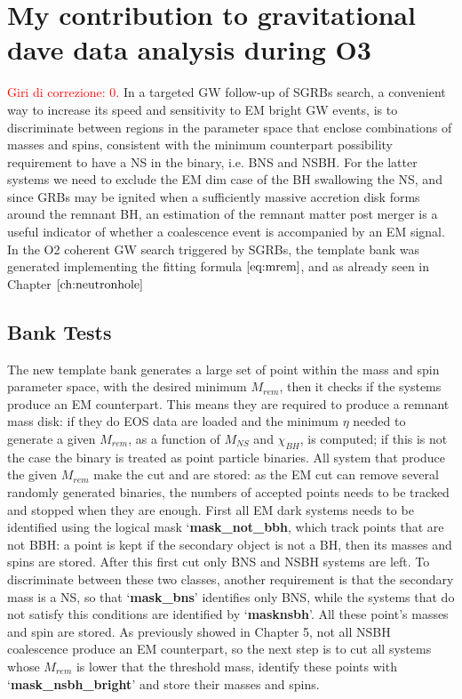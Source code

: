 \documentclass[binding=0.6cm, LaM]{sapthesis}
\newcommand{\fpg}[1]{\textcolor{red}{#1} }
\begin{document}
\chapter{My contribution to gravitational dave data analysis during O3}
\fpg{Giri di correzione: 0.}%
	In a targeted GW follow-up of SGRBs search, a convenient way to increase its speed and sensitivity to EM bright GW events, 
	is to discriminate between regions in the parameter space that enclose combinations of masses and spins, 
	consistent with the minimum counterpart possibility requirement to have a NS in the binary, i.e. BNS and NSBH.
	For the latter systems we need to exclude the EM dim case of the BH swallowing the NS,
	and since GRBs may be ignited when a sufficiently massive accretion disk forms around the remnant BH, 
	an estimation of the remnant matter post merger is a useful indicator of whether a coalescence event is accompanied by an EM signal.         
	In the O2 coherent GW search triggered by SGRBs, the template bank was generated implementing the fitting formula $\ref{eq:mrem}$,
	and as already seen in Chapter $\ref{ch:neutronhole}$  

\section{Bank Tests}

	The new template bank generates a large set of point within the mass and spin parameter space,
	with the desired minimum $M_{rem}$, then it checks if the systems produce an EM counterpart.
	This means they are required to produce a remnant mass disk: 
	if they do EOS data are loaded and the minimum $\eta$ needed to generate a given $M_{rem}$,
	as a function of $M_{NS}$ and $\chi_{BH}$,  is computed;
	if this is not the case the binary is treated as point particle binaries.
	All system that produce the given $M_{rem}$ make the cut and are stored: 
	as the EM cut can remove several randomly generated binaries, 
	the numbers of accepted points needs to be tracked and stopped when they are enough.
	First all EM dark systems needs to be identified using the logical mask ‘\textbf{{\color{red}mask\_not\_bbh}}, 
	which track points that are not BBH: a point is kept if the secondary object is not a BH, 
	then its masses and spins are stored.
	After this first cut only BNS and NSBH systems are left. 
	To discriminate between these two classes, another requirement is that the secondary mass is a NS, 
	so that ‘\textbf{{\color{green}mask\_bns}}’ identifies only BNS, while the systems that do not satisfy this conditions 
	are identified by ‘\textbf{{\color{black}masknsbh}}’.	
	All these point’s masses and spin are stored.
	As previously showed in Chapter 5, not all NSBH coalescence produce an EM counterpart, 
	so the next step is to cut all systems whose $M_{rem}$ is lower that the threshold mass, 
	identify these points with ‘\textbf{{\color{blue}mask\_nsbh\_bright}}’ and store their masses and spins. 
\end{document}
